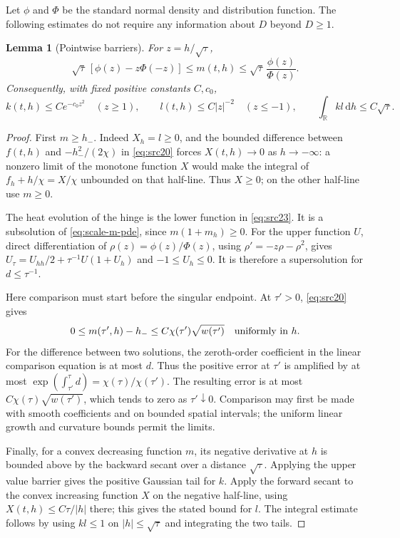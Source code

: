 \documentclass[11pt,a4paper]{article}
\numberwithin{equation}{section}
\newtheorem{lemma}[theorem]{Lemma}
\theoremstyle{definition}
\theoremstyle{remark}
\newcommand{\R}{\mathbb R}
\newcommand{\dd}{\mathrm d}
\begin{document}
Let $\phi$ and $\Phi$ be the standard normal density and distribution
function. The following estimates do not require any information about
$D$ beyond $D\ge1$.
\begin{lemma}[Pointwise barriers]\label{lem:scale-barriers}
For $z=h/\sqrt\tau$,
\begin{equation}\label{eq:src23}
 \sqrt\tau\,[\phi(z)-z\Phi(-z)]\le m(t,h)
 \le\sqrt\tau\,\frac{\phi(z)}{\Phi(z)}.
\end{equation}
Consequently, with fixed positive constants $C,c_0$,
\begin{equation}\label{eq:src24}
 k(t,h)\le C e^{-c_0z^2}\quad(z\ge1),\qquad
 l(t,h)\le C|z|^{-2}\quad(z\le-1),\qquad
 \int_{\R}kl\,\dd h\le C\sqrt\tau.
\end{equation}
\end{lemma}
\begin{proof}
First $m\ge h_-$. Indeed $X_h=l\ge0$, and the bounded difference
between $f(t,h)$ and $-h_-^2/(2\chi)$ in \eqref{eq:src20}
forces $X(t,h)\to0$ as $h\to-\infty$: a nonzero limit of the
monotone function $X$ would make the integral of
$f_h+h/\chi=X/\chi$ unbounded on that half-line. Thus $X\ge0$;
on the other half-line use $m\ge0$.

The heat evolution of the hinge is the lower function in
\eqref{eq:src23}. It is a subsolution of \eqref{eq:scale-m-pde}, since
$m(1+m_h)\ge0$. For the upper function $U$, direct differentiation of
$\rho(z)=\phi(z)/\Phi(z)$, using
$\rho'=-z\rho-\rho^2$, gives
$U_\tau=U_{hh}/2+\tau^{-1}U(1+U_h)$ and $-1\le U_h\le0$.
It is therefore a supersolution for $d\le\tau^{-1}$.

Here comparison must start before the singular endpoint. At
$\tau'>0$, \eqref{eq:src20} gives
\[
 0\le m(\tau',h)-h_-\le C\chi(\tau')\sqrt{w(\tau')}
 \quad\hbox{uniformly in }h.
\]
For the difference between two solutions, the zeroth-order coefficient
in the linear comparison equation is at most $d$. Thus the positive
error at $\tau'$ is amplified by at most
$\exp(\int_{\tau'}^\tau d)=\chi(\tau)/\chi(\tau')$.
The resulting error is at most $C\chi(\tau)\sqrt{w(\tau')}$, which
tends to zero as $\tau'\downarrow0$. Comparison may first be made with
smooth coefficients and on bounded spatial intervals; the uniform
linear growth and curvature bounds permit the limits.

Finally, for a convex decreasing function $m$, its negative derivative
at $h$ is bounded above by the backward secant over a distance
$\sqrt\tau$. Applying the upper value barrier gives the positive
Gaussian tail for $k$. Apply the forward secant to the convex increasing
function $X$ on the negative half-line, using
$X(t,h)\le C\tau/|h|$ there; this gives the stated bound for $l$.
The integral estimate follows by using $kl\le1$ on $|h|\le\sqrt\tau$
and integrating the two tails.
\end{proof}
\end{document}
